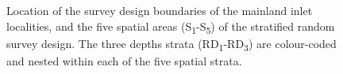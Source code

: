 \documentclass[12pt]{article}\usepackage[]{graphicx}\usepackage[]{color}
\begin{document}
\begin{figure}[htb]

{\centering {} 

}

\caption{Location of the survey design boundaries of the mainland inlet localities, and the five spatial areas (S\textsubscript{1}-S\textsubscript{5}) of the stratified random survey design. The three depths strata (RD\textsubscript{1}-RD\textsubscript{3}) are colour-coded and nested within each of the five spatial strata.}\label{fig:figure1}
\end{figure}
\clearpage
\end{document}
